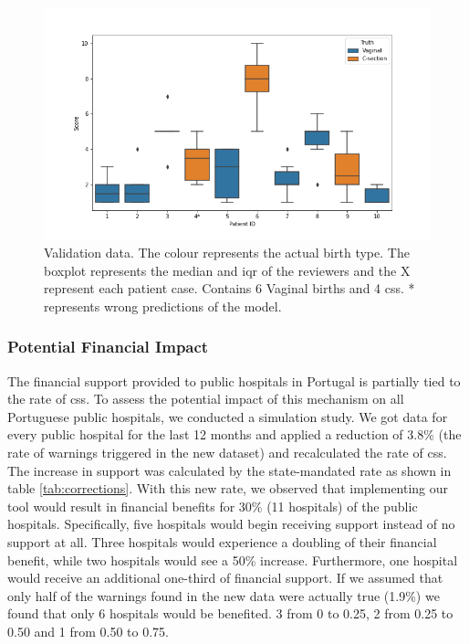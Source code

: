 \begin{figure}[htbp]
\centering
\captionsetup{justification=centering}
\caption[Obstetrics questionnaires data]{Validation data. The colour represents the actual birth type. The boxplot represents the median and \ac{iqr} of the reviewers and the X represent each patient case. Contains 6 Vaginal births and 4 \acp{cs}. * represents wrong predictions of the model.}\label{fig:clinical} 
\includegraphics[scale=0.60]{figures/clinical_assessment.png}
\end{figure}




\subsubsection{Potential Financial Impact}
The financial support provided to public hospitals in Portugal is partially tied to the rate of \acp{cs}. To assess the potential impact of this mechanism on all Portuguese public hospitals, we conducted a simulation study. We got data for every public hospital for the last 12 months \cite{pordatacesarianas} and applied a reduction of 3.8\% (the rate of warnings triggered in the new dataset) and recalculated the rate of \acp{cs}. The increase in support was calculated by the state-mandated rate as shown in table \ref{tab:corrections}. With this new rate, we observed that implementing our tool would result in financial benefits for 30\% (11 hospitals) of the public hospitals. Specifically, five hospitals would begin receiving support instead of no support at all. Three hospitals would experience a doubling of their financial benefit, while two hospitals would see a 50\% increase. Furthermore, one hospital would receive an additional one-third of financial support.
If we assumed that only half of the warnings found in the new data were actually true (1.9\%) we found that only 6 hospitals would be benefited. 3 from 0 to 0.25, 2 from 0.25 to 0.50 and 1 from 0.50 to 0.75.


